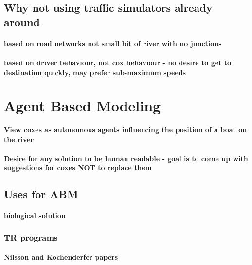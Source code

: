       \subsection{Why not using traffic simulators already around}
        \paragraph{based on road networks not small bit of river with no junctions}
        \paragraph{based on driver behaviour, not cox behaviour - no desire to get to destination quickly, may prefer sub-maximum speeds}
        
  \section{Agent Based Modeling}
    \paragraph{View coxes as autonomous agents influencing the position of a boat on the river}
    \paragraph{Desire for any solution to be human readable - goal is to come up with suggestions for coxes NOT to replace them}
    \subsection{Uses for ABM}
      \paragraph{biological solution}
    
      
      \subsubsection{TR programs}
        \paragraph{Nilsson and Kochenderfer papers}